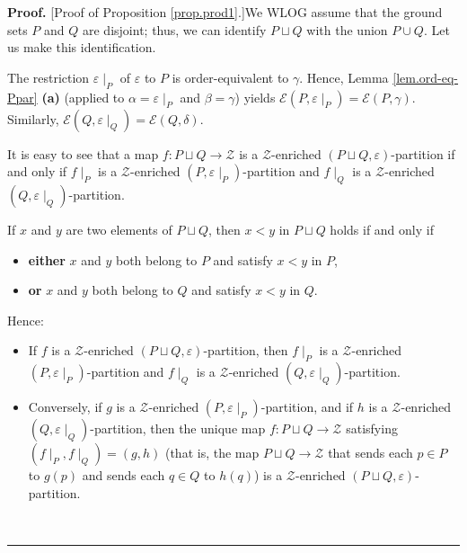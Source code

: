 \documentclass[numbers=enddot,12pt,final,onecolumn,notitlepage]{scrartcl}%
\theoremstyle{definition}
\newenvironment{proof}[1][Proof]{\noindent\textbf{#1.} }{\ \rule{0.5em}{0.5em}}
\newenvironment{verlong}{}{}
\newenvironment{vershort}{}{}
\begin{document}
\begin{proof}
[Proof of Proposition \ref{prop.prod1}.]We WLOG assume that the ground sets
$P$ and $Q$ are disjoint; thus, we can identify $P\sqcup Q$ with the union
$P\cup Q$.
Let us make this identification.

The restriction $\varepsilon\mid_P$ of $\varepsilon$ to $P$ is order-equivalent
to $\gamma$. Hence, Lemma \ref{lem.ord-eq-Ppar} \textbf{(a)} (applied to
$\alpha = \varepsilon\mid_P$ and $\beta = \gamma$) yields
$\mathcal{E}\left(P, \varepsilon\mid_P\right)
= \mathcal{E}\left(P, \gamma\right)$.
Similarly,
$\mathcal{E}\left(Q, \varepsilon\mid_Q\right)
= \mathcal{E}\left(Q, \delta\right)$.

\begin{vershort}
It is easy to see that a map $f : P \sqcup Q \to \mathcal{Z}$
is a $\mathcal{Z}$-enriched $\left(P \sqcup Q, \varepsilon\right)$-partition
if and only if $f \mid_P$ is a $\mathcal{Z}$-enriched
$\left(  P,\varepsilon\mid_P\right)$-partition and
$f \mid_Q$ is a $\mathcal{Z}$-enriched
$\left(  Q,\varepsilon\mid_Q\right)$-partition.
\end{vershort}

\begin{verlong}
If $x$ and $y$ are two elements of $P \sqcup Q$, then $x < y$ in $P \sqcup Q$
holds if and only if
\begin{itemize}
\item \textbf{either} $x$ and $y$ both belong to $P$ and satisfy $x < y$ in $P$,
\item \textbf{or} $x$ and $y$ both belong to $Q$ and satisfy $x < y$ in $Q$.
\end{itemize}
Hence:
\begin{itemize}
\item If $f$ is a
$\mathcal{Z}$-enriched $\left(P \sqcup Q, \varepsilon\right)$-partition,
then $f \mid_P$ is a $\mathcal{Z}$-enriched
$\left(  P,\varepsilon\mid_P\right)$-partition and
$f \mid_Q$ is a $\mathcal{Z}$-enriched
$\left(  Q,\varepsilon\mid_Q\right)$-partition.
\item Conversely, if $g$ is a $\mathcal{Z}$-enriched
$\left(  P,\varepsilon\mid_P\right)$-partition, and if
$h$ is a $\mathcal{Z}$-enriched
$\left(  Q,\varepsilon\mid_Q\right)$-partition, then the unique map
$f : P \sqcup Q \to \mathcal{Z}$ satisfying
$\left(  f\mid_{P},f\mid_{Q}\right) = \left(g, h\right)$
(that is, the map $P \sqcup Q \to \mathcal{Z}$
that sends each $p \in P$ to $g \left( p \right)$
and sends each $q \in Q$ to $h \left( q \right)$) is
a $\mathcal{Z}$-enriched $\left(P \sqcup Q, \varepsilon\right)$-partition.
\end{itemize}
\end{verlong}


\end{proof}
\end{document}
